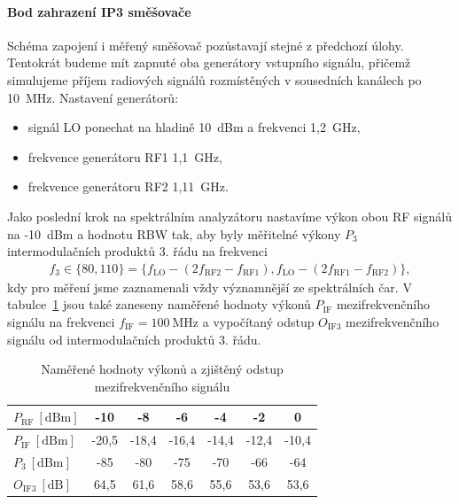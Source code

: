 \documentclass[11pt,a4paper]{article}
\begin{document}
\paragraph*{Bod zahrazení IP3 směšovače} Schéma zapojení i měřený směšovač pozůstavají stejné z předchozí úlohy. Tentokrát budeme mít zapnuté oba generátory vstupního signálu, přičemž simulujeme příjem radiových signálů rozmístěných v sousedních kanálech po 10~MHz. Nastavení generátorů:
\begin{itemize}
    \item signál LO ponechat na hladině 10~dBm a frekvenci 1,2~GHz,
    \item frekvence generátoru RF1 1,1~GHz,
    \item frekvence generátoru RF2 1,11~GHz.
\end{itemize}
Jako poslední krok na spektrálním analyzátoru nastavíme výkon obou RF signálů na -10~dBm a hodnotu RBW tak, aby byly měřitelné výkony $P_3$ intermodulačních produktů 3. řádu na frekvenci
\begin{align*}
    f_3 \in \{80,110\} = \{f_{\mathrm{LO}} - (2f_{\mathrm{RF2}} - f_{\mathrm{RF1}}), f_{\mathrm{LO}} - (2f_{\mathrm{RF1}} - f_{\mathrm{RF2}})\},
\end{align*}
kdy pro měření jsme zaznamenali vždy významnější ze spektrálních čar. V tabulce~\ref{table:task2-data} jsou také zaneseny naměřené hodnoty výkonů $P_{\mathrm{IF}}$ mezifrekvenčního signálu na frekvenci $f_{\mathrm{IF}} = 100 \ \mathrm{MHz}$ a vypočítaný odstup $O_{\mathrm{IF3}}$ mezifrekvenčního signálu od intermodulačních produktů 3. řádu.
\begin{table}[!ht]
    \centering
    \begin{tabular}{| l || c | c | c | c | c | c |}
        \hline
        $P_{\mathrm{RF}} \ [\mathrm{dBm}]$ & -10 & -8 & -6 & -4 & -2 & 0\\
        \hline
        $P_{\mathrm{IF}} \ [\mathrm{dBm}]$ & -20,5 & -18,4 & -16,4 & -14,4 & -12,4 & -10,4\\
        \hline
        $P_3 \ [\mathrm{dBm}]$ & -85 & -80 & -75 & -70 & -66 & -64\\
        \hline\hline
        $O_{\mathrm{IF3}} \ [\mathrm{dB}]$ & 64,5 & 61,6 & 58,6 & 55,6 & 53,6 & 53,6\\
        \hline
    \end{tabular}
    \caption{Naměřené hodnoty výkonů a zjištěný odstup mezifrekvenčního signálu}
    \label{table:task2-data}
\end{table}
\end{document}
